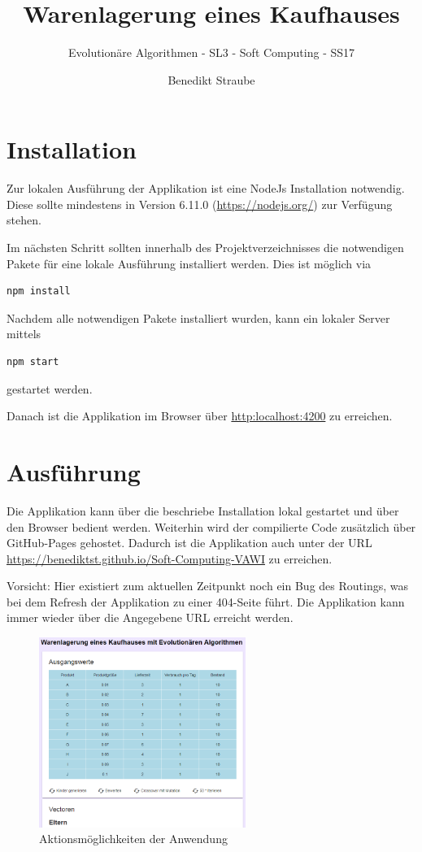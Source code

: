 \documentclass[]{scrartcl}
\title{Warenlagerung eines Kaufhauses}
\subtitle{Evolutionäre Algorithmen - SL3 - Soft Computing - SS17}
\author{Benedikt Straube}
\begin{document}
\maketitle

\newpage

\section{Installation}
Zur lokalen Ausführung der Applikation ist eine NodeJs Installation notwendig. Diese sollte mindestens in Version 6.11.0 (\url{https://nodejs.org/}) zur Verfügung stehen.

Im nächsten Schritt sollten innerhalb des Projektverzeichnisses die notwendigen Pakete für eine lokale Ausführung installiert werden. Dies ist möglich via 
\begin{lstlisting}[backgroundcolor=\color{lightgray}]
npm install
\end{lstlisting}

Nachdem alle notwendigen Pakete installiert wurden, kann ein lokaler Server mittels
\begin{lstlisting}[backgroundcolor=\color{lightgray}]
npm start
\end{lstlisting}
gestartet werden.

Danach ist die Applikation im Browser über \url{http:localhost:4200} zu erreichen.


\section{Ausführung}
\label{ausfuehrung}
Die Applikation kann über die beschriebe Installation lokal gestartet und über den Browser bedient werden. Weiterhin wird der compilierte Code zusätzlich über GitHub-Pages gehostet. Dadurch ist die Applikation auch unter der URL \url{https://benediktst.github.io/Soft-Computing-VAWI} zu erreichen.

Vorsicht: Hier existiert zum aktuellen Zeitpunkt noch ein Bug des Routings, was bei dem Refresh der Applikation zu einer 404-Seite führt. Die Applikation kann immer wieder über die Angegebene URL erreicht werden.

\begin{figure}[htbp]
	\centering
	\includegraphics[width=0.6\textwidth]{res/interface.png}
	\caption{Aktionsmöglichkeiten der Anwendung}
	\label{img:interface}
\end{figure}
\end{document}
